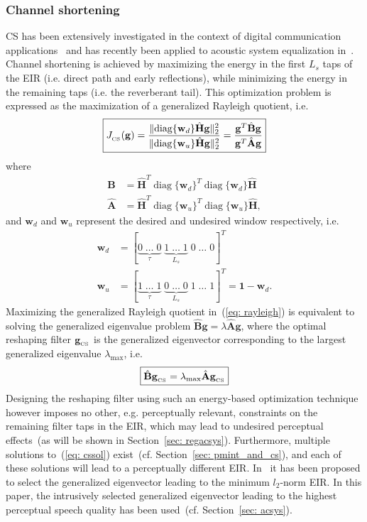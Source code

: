 \documentclass[draftcls,onecolumn,11pt]{IEEEtran}
\DeclareMathOperator{\diag}{diag}
\begin{document}
\subsubsection*{Channel shortening~\cite{Kallinger_ICASSP_2006}}
CS has been extensively investigated in the context of digital communication applications~\cite{Martin_ITSP_2005} and has recently been applied to acoustic system equalization in~\cite{Kallinger_ICASSP_2006, Zhang_IWAENC_2010}.
Channel shortening is achieved by maximizing the energy in the first $L_s$ taps of the EIR (i.e. direct path and early reflections), while minimizing the energy in the remaining taps (i.e. the reverberant tail).
This optimization problem is expressed as the maximization of a generalized Rayleigh quotient, i.e.
\begin{equation}
\label{eq: rayleigh}
\boxed{J_{_{\rm CS}} (\mathbf{g}) =  \frac{\|{\diag}\{\mathbf{w}_d\}\hat{\mathbf{H}}\mathbf{g}\|_2^2}{\|{\diag}\{\mathbf{w}_u\}\hat{\mathbf{H}}\mathbf{g}\|_2^2} = \frac{\mathbf{g}^T \hat{\mathbf{B}} \mathbf{g}}{\mathbf{g}^T \hat{\mathbf{A}} \mathbf{g}}}
\end{equation}
where
\begin{align}
\hat{\mathbf{B}} & = \hat{\mathbf{H}}^{T} {\diag}\{\mathbf{w}_d \}^T{\diag}\{\mathbf{w}_d \}\hat{\mathbf{H}}  \\
\hat{\mathbf{A}} & = \hat{\mathbf{H}}^{T} {\diag}\{\mathbf{w}_u \}^T{\diag}\{\mathbf{w}_u \}\hat{\mathbf{H}},
\end{align}
and $\mathbf{w}_d$ and $\mathbf{w}_u$ represent the desired and undesired window respectively, i.e.
\begin{align}
\label{eq: wincs}
\mathbf{w}_d & = [\underbrace{0 \; \ldots \; 0}_{\tau} \; \underbrace{1 \; \ldots \; 1}_{L_s}\; 0\; \ldots\; 0]^{T}  \\
\mathbf{w}_u & = [\underbrace{1 \; \ldots \; 1}_{\tau} \; \underbrace{0 \; \ldots \; 0}_{L_s}\; 1\; \ldots\; 1]^{T} = \mathbf{1} - \mathbf{w}_d.
\end{align}
Maximizing the generalized Rayleigh quotient in~(\ref{eq: rayleigh}) is equivalent to solving the generalized eigenvalue problem $\hat{\mathbf{B}} \mathbf{g} = \lambda \hat{\mathbf{A}} \mathbf{g}$, where the optimal reshaping filter $\mathbf{g}_{_{\rm CS}}$ is the generalized eigenvector corresponding to the largest generalized eigenvalue $\lambda_{\max}$, i.e.
\begin{equation}
\label{eq: cssol}
\boxed{\hat{\mathbf{B}} \mathbf{g}_{_{\rm CS}} = \lambda_{\max} \hat{\mathbf{A}}\mathbf{g}_{_{\rm CS}}}
\end{equation}
Designing the reshaping filter using such an energy-based optimization technique however imposes no other, e.g. perceptually relevant, constraints on the remaining filter taps in the EIR, which may lead to undesired perceptual effects~(as will be shown in Section~\ref{sec: regacsys}).
Furthermore, multiple solutions to~(\ref{eq: cssol}) exist~(cf. Section~\ref{sec: pmint_and_cs}), and each of these solutions will lead to a perceptually different EIR.
In~\cite{Zhang_IWAENC_2010} it has been proposed to select the generalized eigenvector leading to the minimum $l_2$-norm EIR.
In this paper, the intrusively selected generalized eigenvector leading to the highest perceptual speech quality has been used~(cf. Section~\ref{sec: acsys}).
\end{document}

